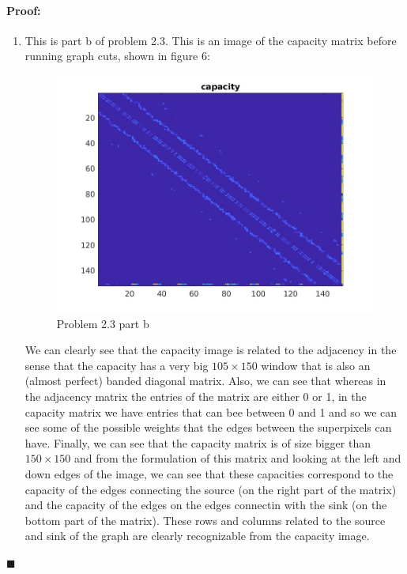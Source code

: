 \documentclass[12pt]{article}
\newenvironment{proof}{\paragraph{Proof: }}{\hfill$\blacksquare$}
\begin{document}
\begin{proof}
\begin{enumerate}
\begin{enumerate}
\item This is part b of problem 2.3. This is an image of the capacity matrix before running graph cuts, shown in figure 6:

\begin{figure}[!htbp]
\centering
\includegraphics[width=18cm]{capacity_2_3b.jpg}
\caption{Problem 2.3 part b}
\end{figure}

We can clearly see that the capacity image is related to the adjacency in the sense that the capacity has a very big $105 \times 150$ window that is also an (almost perfect) banded diagonal matrix. Also, we can see that whereas in the adjacency matrix the entries of the matrix are either 0 or 1, in the capacity matrix we have entries that can bee between 0 and 1 and so we can see some of the possible weights that the edges between the superpixels can have. Finally, we can see that the capacity matrix is of size bigger than $150 \times 150 $ and from the formulation of this matrix and looking at the left and down edges of the image, we can see that these capacities correspond to the capacity of the edges connecting the source (on the right part of the matrix) and the capacity of the edges on the edges connectin with the sink (on the bottom part of the matrix). These rows and columns related to the source and sink of the graph are clearly recognizable from the capacity image.  


\end{enumerate}
\end{enumerate}
\end{proof}
\end{document}
